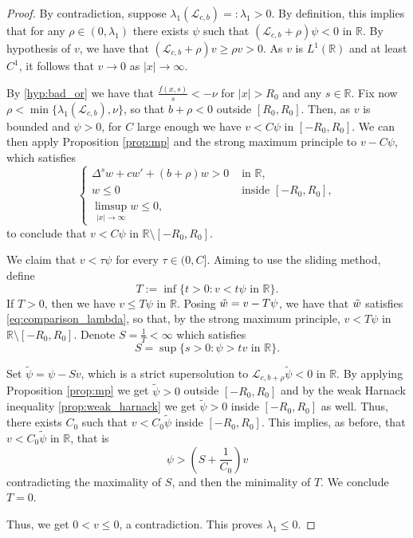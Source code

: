 \documentclass[11pt,a4paper]{amsart}
\newcommand{\Lop}{\mathcal{L}}
\newcommand{\R}{\mathbb{R}}
\newcommand{\inSet}[1]{\text{ in } {#1}}
\begin{document}
\begin{proof}
By contradiction, suppose $\lambda_1(\Lop_{c,b}) =: \lambda_1 > 0$. By definition, this implies that for any $\rho \in (0, \lambda_1)$ there exists $\psi$ such that $(\Lop_{c,b} + \rho) \psi < 0$ in $\R$. By hypothesis of $v$, we have that $(\Lop_{c,b} + \rho) v \geq \rho v > 0$. As $v$ is $L^1(\R)$ and at least $C^1$, it follows that $v\rightarrow 0$ as $|x|\rightarrow \infty$.

By \eqref{hyp:bad_or} we have that $\frac{f(x,s)}{s} < -\nu$ for $|x| > R_0$ and any $s\in \R$. Fix now $\rho < \min\{\lambda_1(\Lop_{c,b}), \nu\}$, so that $b + \rho < 0$ outside $[R_0, R_0]$. Then, as $v$ is bounded and $\psi >0$, for $C$ large enough we have $v < C\psi$ in $[-R_0,R_0]$. We can then apply Proposition \ref{prop:mp} and the strong maximum principle to $v-C\psi$, which satisfies
\begin{equation}
\label{eq:comparison_lambda}
\begin{cases}
\Delta^s w  +cw'+ (b + \rho) w >  0 & \inSet{\R},\\
w\leq 0 & \text{ inside } [-R_0, R_0], \\
\limsup_{|x|\rightarrow \infty} w \leq 0,
\end{cases}
\end{equation}
to conclude that $v < C\psi$ in $\R \setminus [-R_0,R_0]$. 

We claim that $v< \tau\psi$ for every $\tau \in (0, C]$. Aiming to use the sliding method, define
\[T := \inf \{ t > 0: v < t \psi \text{ in }\R\}.\]
If $T>0$, then we have $v\leq T\psi$ in $\R$. Posing $\Tilde{w} = v-T\psi$, we have that $\Tilde{w}$ satisfies \eqref{eq:comparison_lambda}, so that, by the strong maximum principle, $v < T\psi$ in $\R \setminus [-R_0,R_0]$. Denote $S = \frac{1}{T} < \infty$ which satisfies
\[S = \sup \{s > 0: \psi  > t v \text{ in } \R\}.\]

Set $\tilde{\psi} = \psi - Sv$, which is a strict supersolution to $\Lop_{c,b+\rho} \tilde{\psi}<0$ in $\R$. By applying Proposition \ref{prop:mp} we get $\tilde{\psi} > 0$ outside $[-R_0, R_0]$ and by the weak Harnack inequality \ref{prop:weak_harnack} we get $ \tilde{\psi} > 0$ inside $[-R_0,R_0]$ as well. Thus, there exists $C_0$ such that $v < C_0 \tilde{\psi}$ inside $[-R_0,R_0]$. This implies, as before, that $v < C_0  \tilde{\psi}$ in $\R$, that is
 \[ \psi > \left( S + \frac{1}{C_0}\right)v  \] 
 contradicting the maximality of $S$, and then the minimality of $T$. We conclude $T=0$. 

Thus, we get $0<v\leq 0$, a contradiction. This proves $\lambda_1 \leq 0$.


\end{proof}
\end{document}
